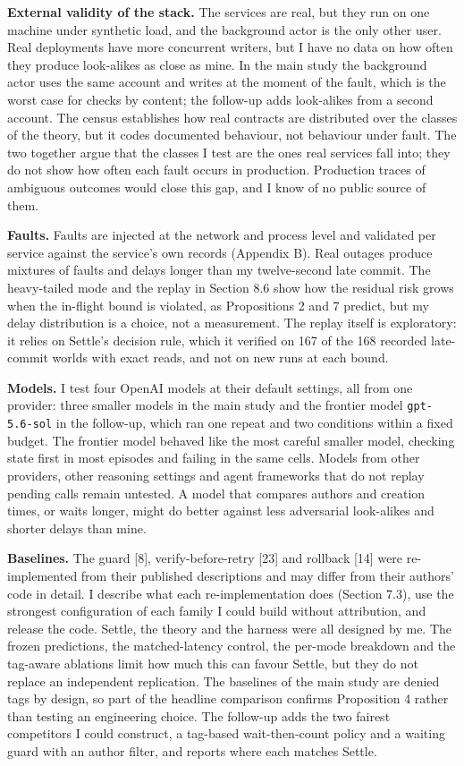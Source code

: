 \documentclass[
  10pt,
]{article}
\begin{document}
\textbf{External validity of the stack.} The services are real, but they
run on one machine under synthetic load, and the background actor is the
only other user. Real deployments have more concurrent writers, but I
have no data on how often they produce look-alikes as close as mine. In
the main study the background actor uses the same account and writes at
the moment of the fault, which is the worst case for checks by content;
the follow-up adds look-alikes from a second account. The census
establishes how real contracts are distributed over the classes of the
theory, but it codes documented behaviour, not behaviour under fault.
The two together argue that the classes I test are the ones real
services fall into; they do not show how often each fault occurs in
production. Production traces of ambiguous outcomes would close this
gap, and I know of no public source of them.

\textbf{Faults.} Faults are injected at the network and process level
and validated per service against the service's own records (Appendix
B). Real outages produce mixtures of faults and delays longer than my
twelve-second late commit. The heavy-tailed mode and the replay in
Section 8.6 show how the residual risk grows when the in-flight bound is
violated, as Propositions 2 and 7 predict, but my delay distribution is
a choice, not a measurement. The replay itself is exploratory: it relies
on Settle's decision rule, which it verified on 167 of the 168 recorded
late-commit worlds with exact reads, and not on new runs at each bound.

\textbf{Models.} I test four OpenAI models at their default settings,
all from one provider: three smaller models in the main study and the
frontier model \texttt{gpt-5.6-sol} in the follow-up, which ran one
repeat and two conditions within a fixed budget. The frontier model
behaved like the most careful smaller model, checking state first in
most episodes and failing in the same cells. Models from other
providers, other reasoning settings and agent frameworks that do not
replay pending calls remain untested. A model that compares authors and
creation times, or waits longer, might do better against less
adversarial look-alikes and shorter delays than mine.

\textbf{Baselines.} The guard {[}8{]}, verify-before-retry {[}23{]} and
rollback {[}14{]} were re-implemented from their published descriptions
and may differ from their authors' code in detail. I describe what each
re-implementation does (Section 7.3), use the strongest configuration of
each family I could build without attribution, and release the code.
Settle, the theory and the harness were all designed by me. The frozen
predictions, the matched-latency control, the per-mode breakdown and the
tag-aware ablations limit how much this can favour Settle, but they do
not replace an independent replication. The baselines of the main study
are denied tags by design, so part of the headline comparison confirms
Proposition 4 rather than testing an engineering choice. The follow-up
adds the two fairest competitors I could construct, a tag-based
wait-then-count policy and a waiting guard with an author filter, and
reports where each matches Settle.
\end{document}
